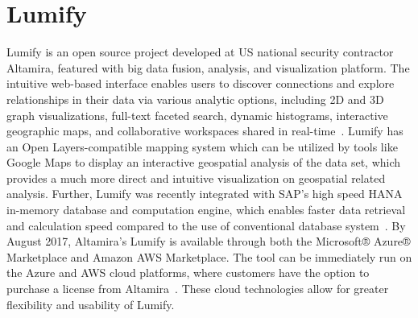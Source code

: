 \section{Lumify}
Lumify is an open source project developed at US national security contractor Altamira, featured with 
big data fusion, analysis, and visualization platform. The intuitive web-based interface enables users 
to discover connections and explore relationships in their data via various analytic options, including 
2D and 3D graph visualizations, full-text faceted search, dynamic histograms, interactive geographic 
maps, and collaborative workspaces shared in real-time~\cite{hid-sp18-405-www-lumify}. Lumify has 
an Open Layers-compatible mapping system which can be utilized by tools like Google Maps to display 
an interactive geospatial analysis of the data set, which provides a much more direct and intuitive 
visualization on geospatial related analysis. Further, Lumify was recently integrated with SAP's high 
speed HANA in-memory database and computation engine, which enables faster data retrieval and 
calculation speed compared to the use of conventional database 
system~\cite{hid-sp18-405-linkedinblog-lumify}. By August 2017, Altamira’s Lumify is available through 
both the Microsoft® Azure® Marketplace and Amazon AWS Marketplace. The tool can be immediately 
run on the Azure and AWS cloud platforms, where customers have the option to purchase a license 
from Altamira~\cite{hid-sp18-405-wwwaws-lumify}\cite{hid-sp18-405-wwwazure-lumify}. These cloud 
technologies allow for greater flexibility and usability of Lumify. 